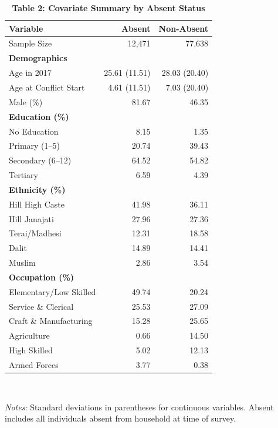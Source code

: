 \documentclass[12pt,letterpaper]{article}
\begin{document}
\begin{table}[H]
\centering
\caption*{\textbf{Table 2: Covariate Summary by Absent Status}}
\footnotesize
\begin{tabular}{@{}l r r@{}}
\toprule
Variable & Absent & Non-Absent \\
\midrule
Sample Size                 & 12,471 & 77,638 \\[3pt]
\multicolumn{3}{l}{\textbf{Demographics}} \\
\quad Age in 2017           & 25.61 (11.51) & 28.03 (20.40) \\
\quad Age at Conflict Start & 4.61 (11.51)  & 7.03 (20.40) \\
\quad Male (\%)             & 81.67         & 46.35 \\[3pt]
\multicolumn{3}{l}{\textbf{Education (\%)}} \\
\quad No Education          & 8.15  & 1.35 \\
\quad Primary (1--5)        & 20.74 & 39.43 \\
\quad Secondary (6--12)     & 64.52 & 54.82 \\
\quad Tertiary              & 6.59  & 4.39 \\[3pt]
\multicolumn{3}{l}{\textbf{Ethnicity (\%)}} \\
\quad Hill High Caste       & 41.98 & 36.11 \\
\quad Hill Janajati         & 27.96 & 27.36 \\
\quad Terai/Madhesi         & 12.31 & 18.58 \\
\quad Dalit                 & 14.89 & 14.41 \\
\quad Muslim                & 2.86  & 3.54 \\[3pt]
\multicolumn{3}{l}{\textbf{Occupation (\%)}} \\
\quad Elementary/Low Skilled & 49.74 & 20.24 \\
\quad Service \& Clerical   & 25.53 & 27.09 \\
\quad Craft \& Manufacturing & 15.28 & 25.65 \\
\quad Agriculture           & 0.66  & 14.50 \\
\quad High Skilled          & 5.02  & 12.13 \\
\quad Armed Forces          & 3.77  & 0.38 \\
\bottomrule
\end{tabular}
\\[4pt]
\begin{minipage}{0.85\textwidth}
\scriptsize
\textit{Notes:} Standard deviations in parentheses for continuous variables. Absent includes all individuals absent from household at time of survey.
\end{minipage}
\end{table}
\end{document}
